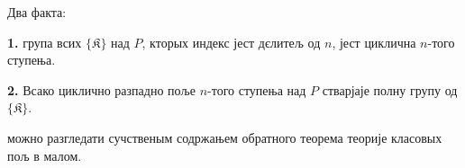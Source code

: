 \documentclass[11pt]{article}
\begin{document}
Два факта:

\noindent\textbf{1.} група всих \(\{\mathfrak K\}\) над \(P\), кторых индекс јест дєлитељ од \(n\), јест циклична \(n\)-того ступења.

\noindent\textbf{2.} Всако циклично разпадно поље \(n\)-того ступења над \(P\) стварјаје полну групу од \(\{\mathfrak K\}\).

можно разгледати сучственым содржањем обратного теорема теорије класовых пољ в малом.


\clearpage
\end{document}
